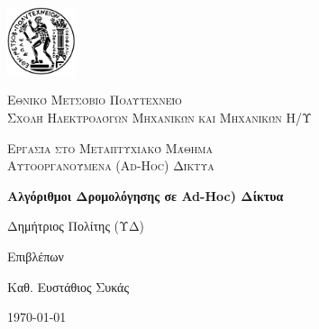 \documentclass[12pt]{report}
\newcommand\blankpage{%
    \null
    \thispagestyle{empty}%
    \addtocounter{page}{-1}%
    \newpage}
\begin{document}

\hypersetup{pageanchor=false}

\begin{titlepage}
  \centering
  \includegraphics[width=0.15\textwidth]{pyrforos}\par\vspace{1cm}
  {\scshape\LARGE Εθνικό Μετσόβιο Πολυτεχνείο\\
  Σχολή Ηλεκτρολόγων Μηχανικών και Μηχανικών Η/Υ\par}
  \vspace{1cm}
  {\scshape\Large Εργασία στο Μεταπτυχιακό Μάθημα\\
  Αυτοοργανούμενα (\textlatin{Ad-Hoc}) Δίκτυα\par}
  \vspace{1.5cm}
  {\Large\bfseries Αλγόριθμοι Δρομολόγησης σε \textlatin{Ad-Hoc}) Δίκτυα\par}
  \vspace{2cm}
  {\large Δημήτριος Πολίτης (ΥΔ)\par}
  \vfill
  Επιβλέπων \par
  Καθ. Ευστάθιος Συκάς

  \vfill

  {\large \today\par}
  \afterpage{\blankpage}
\end{titlepage}

\tableofcontents
\thispagestyle{empty}

\listoffigures
\thispagestyle{empty}

\begin{abstract}
Η ανίχνευση ανωμαλιών στη δικτυακή κίνηση ασύρματων δικτύων είναι μια σημαντική διαδικασία, η οποία χρησιμοποιείται για την διάγνωση βλαβών, την ανίχνευση επιθέσεων και την παρακολούθηση εφαρμογών. Σε αυτό το πόνημα εξετάζουμε διάφορες προσεγγίσεις ανίχνευσης εισβολών, που βασίζονται σε μεθόδους καταγραφής των ανωμαλιών στη δικτυακή κίνηση και οι οποίες περιλαμβάνουν μεταξύ άλλων στατιστικές, \textlatin{signature based} ή μεθόδους που περιλαμβάνουν μηχανική μάθηση (\textlatin{machine learning}). Η προσέγγισή μας βασίζεται στην καταγραφή και ταξινόμηση σύγχρονων μεθόδων ανίχνευσης εισβολών σε ασύρματα δίκτυα(\textlatin{wireless intrusion detection system (IDS)} με βάση τον τύπο του ασύρματου δικτύου, την τεχνική ανίχνευσης, τη διαδικασία συλλογής δεδομένων και τις μεθόδους ανάλυσης. Περιγράφουμε σε αδρές γραμμές τα υπέρ και τα κατά κάθε τεχνικής ανίχνευσης επιθέσεων, λαμβάνοντας υπόψη και την υπολογιστική τους πολυπλοκότητα.

\vspace{10mm}

\noindent \textbf{Λέξεις κλειδιά:} Ηλεκτρονική Μάθηση, Ανοιχτός Κώδικας, Διαδίκτυο.
\end{abstract}
\end{document}
